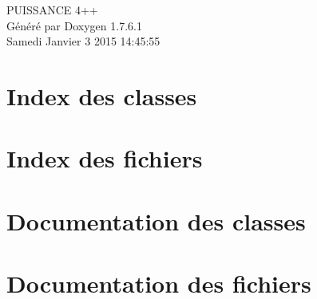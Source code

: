 \documentclass[a4paper]{book}
\begin{document}
\hypersetup{pageanchor=false,citecolor=blue}
\begin{titlepage}
\vspace*{7cm}
\begin{center}
{\Large \-P\-U\-I\-S\-S\-A\-N\-C\-E 4++ }\\
\vspace*{1cm}
{\large \-Généré par Doxygen 1.7.6.1}\\
\vspace*{0.5cm}
{\small Samedi Janvier 3 2015 14:45:55}\\
\end{center}
\end{titlepage}
\clearemptydoublepage
{}
\tableofcontents
\clearemptydoublepage
{}
\hypersetup{pageanchor=true,citecolor=blue}
\chapter{\-Index des classes}

\chapter{\-Index des fichiers}

\chapter{\-Documentation des classes}


\chapter{\-Documentation des fichiers}















\printindex
\end{document}
